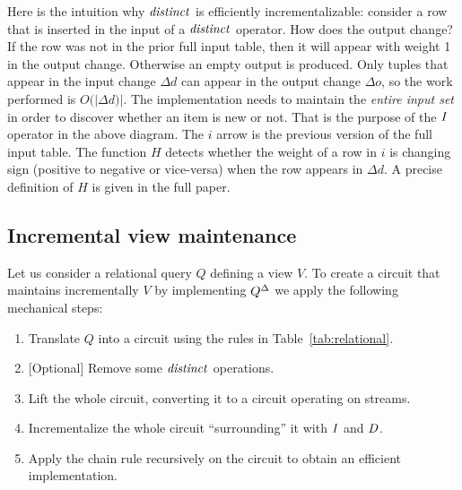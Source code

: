 
Here is the intuition why $\mathit{distinct}$ is efficiently
incrementalizable: consider a row that is inserted in the input of a
$\mathit{distinct}$ operator.  How does the output change?  If the row was not
in the prior full input table, then it will appear with weight 1 in
the output change.  Otherwise an empty output is produced.  Only
tuples that appear in the input change $\Delta d$ can appear in the
output change $\Delta o$, so the work performed is $O(|\Delta d)|$.
The implementation needs to maintain the \emph{entire input set} in
order to discover whether an item is new or not.  That is the purpose
of the $\mathit{I}$ operator in the above diagram.  The $i$ arrow is the
previous version of the full input table.  The function $H$ detects
whether the weight of a row in $i$ is changing sign (positive to
negative or vice-versa) when the row appears in $\Delta d$.  A precise
definition of $H$ is given in the full paper.

\subsection{Incremental view maintenance}

Let us consider a relational query $Q$ defining a view $V$.  To create
a \dbsp circuit that maintains incrementally $V$ by implementing
${Q}^{\Delta}$ we apply the following mechanical steps:

\begin{algorithm}\label{algorithm-inc}\!
\begin{enumerate}
\item Translate $Q$ into a circuit using the rules in Table~\ref{tab:relational}.
\item{} [Optional] Remove some $\mathit{distinct}$ operations.
\item Lift the whole circuit, converting it to a circuit operating
  on streams.
\item Incrementalize the whole circuit ``surrounding'' it with $\mathit{I}$ and $\mathit{D}$.
\item Apply the chain rule recursively on the circuit to obtain an
  efficient implementation.
\end{enumerate}
\end{algorithm}

